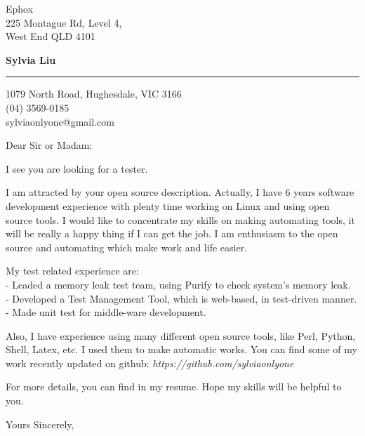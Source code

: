 \documentclass[a4paper,11pt]{letter}
\begin{document}
\signature{Sylvia}
\longindentation=0pt                       %
\let\raggedleft\raggedright                %

\begin{letter}{ Ephox \\
  225 Montague Rd, Level 4, \\
  West End QLD 4101
  }

\begin{flushleft}
{\large\bf Sylvia Liu}
\end{flushleft}
\medskip\hrule height 1pt
\begin{flushright}
\hfill 1079 North Road, Hughesdale, VIC 3166 \\
\hfill (04) 3569-0185 \\
\hfill sylviaonlyone@gmail.com
\end{flushright} 
\vfill %

\opening{Dear Sir or Madam:}
\noindent I see you are looking for a tester. 

\noindent I am attracted by your open source description. Actually, I have 6 years software development experience with plenty time working on Linux and using open source tools. I would like to concentrate my skills on making automating tools, it will be really a happy thing if I can get the job. I am enthusiasm to the open source and automating which make work and life easier.

\noindent My test related experience are: \\
 - Leaded a memory leak test team, using Purify to check system's memory leak. \\
 - Developed a Test Management Tool, which is web-based, in test-driven manner. \\
 - Made unit test for middle-ware development.

\noindent Also, I have experience using many different open source tools, like Perl, Python, Shell, Latex, etc. I used them to make automatic works. You can find some of my work recently updated on github: \emph{https://github.com/sylviaonlyone} 

\noindent For more details, you can find in my resume. Hope my skills will be helpful to you.

\closing{Yours Sincerely,}
\end{letter}
\end{document}
